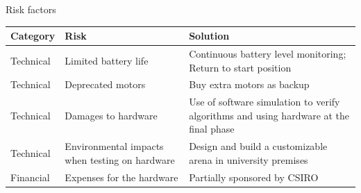 \documentclass[xcolor=table]{beamer}
\begin{document}
\begin{frame}{Risk factors}
  \begin{footnotesize}
  \begin{center}
  \setlength{\arrayrulewidth}{0.2mm}
  \setlength{\tabcolsep}{5pt}
  \renewcommand{\arraystretch}{1.2}
 
  \begin{tabular}{ |p{2cm}|p{3.55cm}|p{5cm}| }
  \hline
  \textbf{Category}&\textbf{Risk}&\textbf{Solution}\\
  \hline
  Technical&Limited battery life&Continuous battery level monitoring; Return to start position\\
  \hline
  Technical&Deprecated motors&Buy extra motors as backup\\
  \hline
  Technical&Damages to hardware&Use of software simulation to verify algorithms and using hardware at the final phase\\
  \hline
  Technical&Environmental impacts when testing on hardware&Design and build a customizable arena in university premises\\
  \hline
  Financial&Expenses for the hardware&Partially sponsored by CSIRO\\
  \hline
  \end{tabular}
  \end{center}
  \end{footnotesize}
\end{frame}
\end{document}
